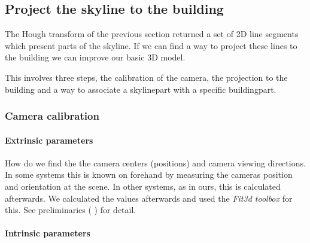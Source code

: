 \subsection{Project the skyline to the building}

	The Hough transform of the previous section returned a set of 2D line
	segments which present parts of the skyline.  If we can find a way to
	project these lines to the building we can improve our basic 3D model.
	
	This involves three steps, the calibration of the camera,
	the projection to the building and a way to
	associate a skylinepart with a specific buildingpart.


	\subsubsection{Camera calibration}

	\paragraph{Extrinsic parameters}
	
	How do we find the the camera centers (positions) and camera viewing
	directions. In some systems this is known on forehand by measuring the cameras position and
	orientation at the scene. In other systems, as in ours, this is calculated 
	afterwards.  We calculated the values afterwards and used the
	\emph{Fit3d toolbox} \cite{Fit3d} for this.
	 See preliminaries (%
	) for detail.\\  

	\paragraph{Intrinsic parameters}

